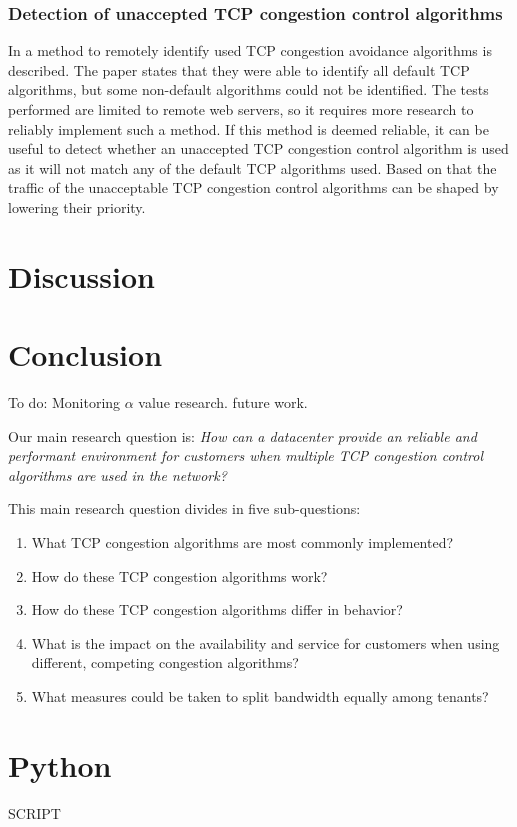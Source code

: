 \documentclass{article}
\begin{document}
\subsubsection{Detection of unaccepted TCP congestion control algorithms}
In \cite{tcp-congestion-identification} a method to remotely identify used TCP congestion avoidance algorithms is described. The paper states that 
they were able to identify all default TCP algorithms, but some non-default algorithms could not be identified. The tests performed are limited to remote web servers, so it requires more research to reliably implement such a method. If this method is deemed reliable, it can be useful to detect whether an unaccepted TCP congestion control algorithm is used as it will not match any of the default TCP algorithms used. Based on that the traffic of the unacceptable TCP congestion control algorithms can be shaped by lowering their priority.

\section{Discussion}\label{sec:discussion}


\section{Conclusion}\label{sec:conclusion}
To do: Monitoring $\alpha$ value research. future work.


Our main research question is:
{\it How can a datacenter provide an reliable and performant environment for
customers when multiple TCP congestion control algorithms are used in the
network?}

\vspace{0.5cm}

This main research question divides in five sub-questions:

\begin{enumerate}
	\item What TCP congestion algorithms are most commonly implemented?
	\item How do these TCP congestion algorithms work?
	\item How do these TCP congestion algorithms differ in behavior?
	\item What is the impact on the availability and service for customers when using different, competing congestion algorithms?
	\item What measures could be taken to split bandwidth equally among tenants?
\end{enumerate}


\printbibliography

\appendix
\section{Python}
\label{appendix:python}
SCRIPT
\end{document}
